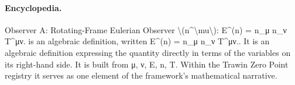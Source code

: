 \paragraph{Encyclopedia.}
Observer A: Rotating-Frame Eulerian Observer \textbackslash{}(n\textasciicircum{}\textbackslash{}mu\textbackslash{}): E\textasciicircum{}(n) = n\_μ n\_ν T\textasciicircum{}μν. is an algebraic definition, written E\textasciicircum{}(n) = n\_μ n\_ν T\textasciicircum{}μν.. It is an algebraic definition expressing the quantity directly in terms of the variables on its right-hand side. It is built from μ, ν, E, n, T. Within the Trawin Zero Point registry it serves as one element of the framework's mathematical narrative.
